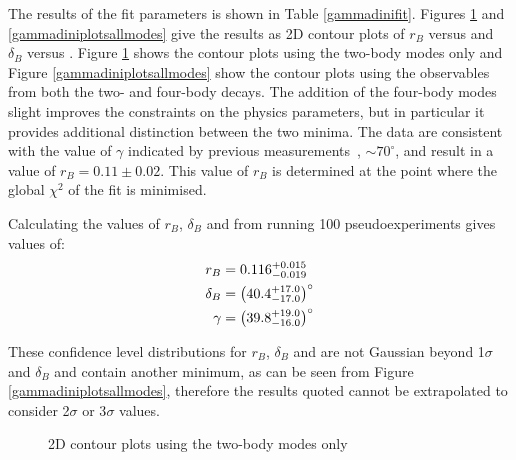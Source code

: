 The results of the fit parameters is shown in Table \ref{gammadinifit}. Figures \ref{gammadiniplots2body} and \ref{gammadiniplotsallmodes} give the results as 2D contour plots of $r_B$ versus \Pgamma and $\delta_B$ versus \Pgamma. Figure \ref{gammadiniplots2body} shows the contour plots using the two-body modes only and Figure \ref{gammadiniplotsallmodes} show the contour plots using the observables from both the two- and four-body decays. The addition of the four-body modes slight improves the constraints on the physics parameters, but in particular it provides additional distinction between the two minima. The data are consistent with the value of $\gamma$ indicated by previous measurements~\cite{LHCb-PAPER-2016-032, CKMFitter}, $\sim 70^\circ$, and result in a value of $r_B = 0.11 \pm 0.02$. This value of $r_B$ is determined at the point where the global $\chi^2$ of the fit is minimised.

Calculating the values of $r_B$, $\delta_B$ and \Pgamma from running 100 pseudoexperiments gives values of:
\begin{align*}
r_B &= 0.116^{+0.015}_{-0.019} \\
\delta_B &= \left(40.4^{+17.0}_{-17.0}\right)^{\circ} \\
\gamma &= \left(39.8^{+19.0}_{-16.0}\right)^{\circ} 
\end{align*}

These confidence level distributions for $r_B$, $\delta_B$ and \Pgamma are not Gaussian beyond 1$\sigma$ and $\delta_B$ and \Pgamma contain another minimum, as can be seen from Figure \ref{gammadiniplotsallmodes}, therefore the results quoted cannot be extrapolated to consider 2$\sigma$ or 3$\sigma$ values. 

\begin{figure}[h]
\centering
{}
\caption{2D contour plots using the two-body modes only}
\label{gammadiniplots2body}
\end{figure}

